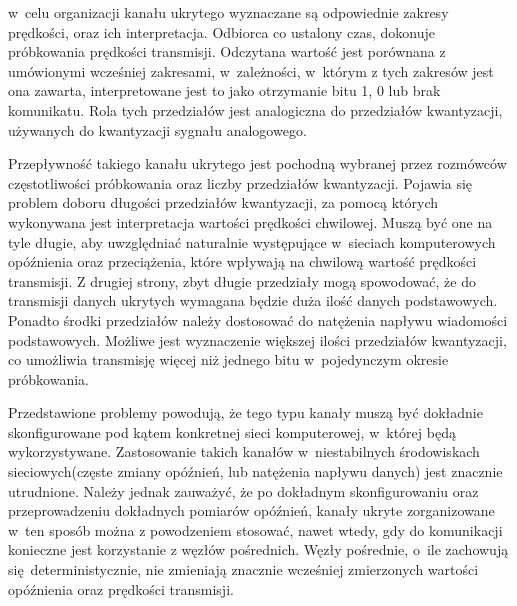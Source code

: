 \documentclass[a4paper, twoside, 12pt]{report}
\begin{document}
        w~celu organizacji kanału ukrytego wyznaczane są odpowiednie zakresy prędkości, oraz ich
        interpretacja. Odbiorca co ustalony czas, dokonuje próbkowania prędkości
        transmisji. Odczytana wartość jest porównana z umówionymi wcześniej zakresami,
        w~zależności, w~którym z tych zakresów jest ona zawarta, interpretowane jest to
        jako otrzymanie bitu 1, 0 lub brak komunikatu. Rola tych przedziałów jest analogiczna
        do przedziałów kwantyzacji, używanych do kwantyzacji sygnału analogowego.

        Przepływność takiego kanału ukrytego jest pochodną wybranej przez rozmówców
        częstotliwości próbkowania oraz liczby przedziałów kwantyzacji. Pojawia się
        problem doboru długości przedziałów kwantyzacji, za pomocą których wykonywana
        jest interpretacja wartości
        prędkości chwilowej. Muszą być one na tyle długie, aby uwzględniać naturalnie
        występujące w~sieciach komputerowych opóźnienia oraz przeciążenia, które wpływają
        na chwilową wartość prędkości transmisji. Z drugiej strony, zbyt długie przedziały
        mogą spowodować, że do transmisji danych ukrytych wymagana będzie duża ilość danych
        podstawowych. Ponadto środki przedziałów należy dostosować do natężenia
        napływu wiadomości podstawowych. Możliwe jest wyznaczenie większej ilości
        przedziałów kwantyzacji, co umożliwia transmisję więcej niż jednego bitu w~pojedynczym
        okresie próbkowania.

        Przedstawione problemy powodują, że tego typu kanały muszą być dokładnie
        skonfigurowane pod kątem konkretnej sieci komputerowej, w~której będą wykorzystywane.
        Zastosowanie takich kanałów w~niestabilnych środowiskach sieciowych(częste zmiany
        opóźnień, lub natężenia napływu danych) jest znacznie utrudnione. Należy jednak
        zauważyć, że po dokładnym skonfigurowaniu oraz przeprowadzeniu dokładnych
        pomiarów opóźnień, kanały ukryte zorganizowane w~ten sposób można z powodzeniem
        stosować, nawet wtedy, gdy do komunikacji konieczne jest korzystanie z węzłów pośrednich.
        Węzły pośrednie, o~ile zachowują się deterministycznie, nie zmieniają znacznie wcześniej
        zmierzonych wartości opóźnienia oraz prędkości transmisji.
\end{document}
